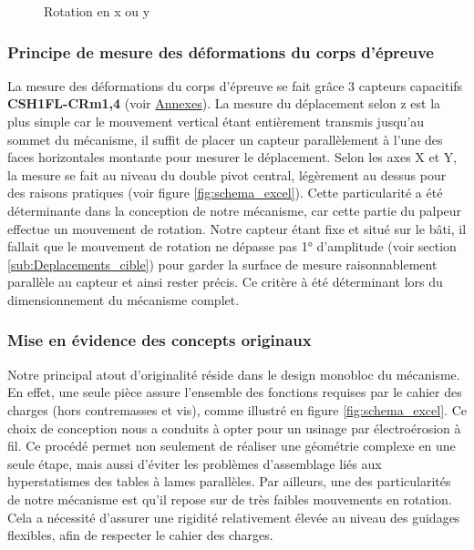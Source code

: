 \documentclass[a4paper, 11pt]{article} %
\begin{document}
\begin{figure}[H]
\begin{minipage}[t]{0.30\linewidth}
        \caption{Rotation en x ou y}  
        \label{fig:mouvement_xy}
    \end{minipage}
\end{figure}



\subsubsection{Principe de mesure des déformations du corps d’épreuve}
La mesure des déformations du corps d'épreuve se fait grâce 3 capteurs capacitifs \textbf{CSH1FL-CRm1,4} (voir \hyperref[Annexes]{Annexes}). La mesure du déplacement selon z est la plus simple car le mouvement vertical étant entièrement transmis jusqu'au sommet du mécanisme, il suffit de placer un capteur parallèlement à l'une des faces horizontales montante pour mesurer le déplacement. Selon les axes X et Y, la mesure se fait au niveau du double pivot central, légèrement au dessus pour des raisons pratiques (voir figure \ref{fig:schema_excel}). Cette particularité a été déterminante dans la conception de notre mécanisme, car cette partie du palpeur effectue un mouvement de rotation. Notre capteur étant fixe et situé sur le bâti, il fallait que le mouvement de rotation ne dépasse pas 1° d'amplitude (voir section \ref{sub:Deplacements_cible}) pour garder la surface de mesure raisonnablement parallèle au capteur et ainsi rester précis. Ce critère à été déterminant lors du dimensionnement du mécanisme complet.


\subsubsection{Mise en évidence des concepts originaux}

Notre principal atout d’originalité réside dans le design monobloc du mécanisme. En effet, une seule pièce assure l’ensemble des fonctions requises par le cahier des charges (hors contremasses et vis), comme illustré en figure \ref{fig:schema_excel}. Ce choix de conception nous a conduits à opter pour un usinage par électroérosion à fil. Ce procédé permet non seulement de réaliser une géométrie complexe en une seule étape, mais aussi d’éviter les problèmes d’assemblage liés aux hyperstatismes des tables à lames parallèles. Par ailleurs, une des particularités de notre mécanisme est qu’il repose sur de très faibles mouvements en rotation. Cela a nécessité d’assurer une rigidité relativement élevée au niveau des guidages flexibles, afin de respecter le cahier des charges. 
\end{document}
